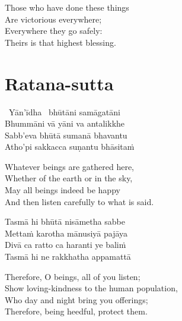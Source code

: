 \begin{english-verses}
  Those who have done these things\\
  Are victorious everywhere;\\
  Everywhere they go safely:\\
  Theirs is that highest blessing.
\end{english-verses}

\suttaRef{[Snp 2.4]}



\section{Ratana-sutta}
\label{ratana-sutta}

\begin{pali-hangtogether}
  \anglebracketleft\ \hspace{-0.5mm}Yān'īdha \hspace{-0.5mm}\anglebracketright\ bhūtāni samāgatāni\\
  Bhummāni vā yāni va antalikkhe\\
  Sabb'eva bhūtā sumanā bhavantu\\
  Atho'pi sakkacca suṇantu bhāsitaṁ
\end{pali-hangtogether}

\begin{english-verses}
  Whatever beings are gathered here,\\
  Whether of the earth or in the sky,\\
  May all beings indeed be happy\\
  And then listen carefully to what is said.
\end{english-verses}

\begin{pali-hang-continued}
  Tasmā hi bhūtā nisāmetha sabbe\\
  Mettaṁ karotha mānusiyā pajāya\\
  Divā ca ratto ca haranti ye baliṁ\\
  Tasmā hi ne rakkhatha appamattā
\end{pali-hang-continued}

\begin{english-verses}
  Therefore, O beings, all of you listen;\\
  Show loving-kindness to the human population,\\
  Who day and night bring you offerings;\\
  Therefore, being heedful, protect them.
\end{english-verses}


